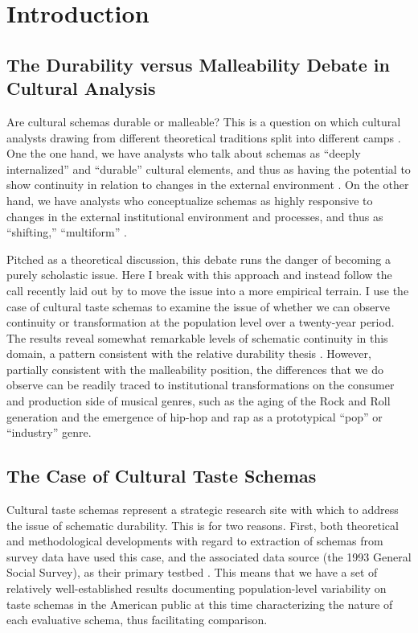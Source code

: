 \documentclass[preprint, authoryear,11pt, 3p]{elsarticle}
\begin{document}
\section{Introduction}
\subsection{The Durability versus Malleability Debate in Cultural Analysis}
Are cultural schemas durable or malleable? This is a question on which cultural analysts drawing from different theoretical traditions split into different camps \citep{vaisey2016cultural}. One the one hand, we have analysts who talk about schemas as ``deeply internalized'' and ``durable'' cultural elements, and thus as having the potential to show continuity in relation to changes in the external environment \citep{bourdieu1990logic, strauss1997cognitive, patterson2014making}. On the other hand, we have analysts who conceptualize schemas as highly responsive to changes in the external institutional environment and processes, and thus as ``shifting,'' ``multiform'' \citep{dimaggio1997culture, swidler2005anchors, sewell2004concept}. 

Pitched as a theoretical discussion, this debate runs the danger of becoming a purely scholastic issue. Here I break with this approach and instead follow the call recently laid out by \citet{vaisey2016cultural} to move the issue into a more empirical terrain. I use the case of cultural taste schemas to examine the issue of whether we can observe continuity or transformation at the population level over a twenty-year period. The results reveal somewhat remarkable levels of schematic continuity in this domain, a pattern consistent with the relative durability thesis \citep{vaisey2016cultural}. However, partially consistent with the malleability position, the differences that we do observe can be readily traced to institutional transformations on the consumer and production side of musical genres, such as the aging of the Rock and Roll generation and the emergence of hip-hop and rap as a prototypical ``pop'' or ``industry'' genre. 
\subsection{The Case of Cultural Taste Schemas}

Cultural taste schemas represent a strategic research site with which to address the issue of schematic durability. This is for two reasons. First, both theoretical and methodological developments with regard to extraction of schemas from survey data have used this case, and the associated data source (the 1993 General Social Survey), as their primary testbed \citep{goldberg2011mapping, boutyline2017improving}. This means that we have a set of relatively well-established results documenting population-level variability on taste schemas in the American public at this time characterizing the nature of each evaluative schema, thus facilitating comparison. 
\end{document}
